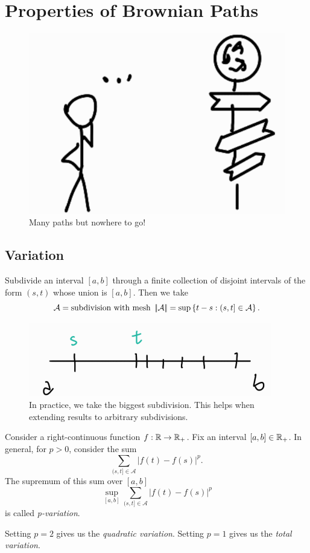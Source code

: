 \documentclass[12pt]{report}
\begin{document}
\section{Properties of Brownian Paths}
\begin{figure}[H]
	\centering
	\includegraphics[width=0.3\linewidth]{img/screenshot040}
	\caption{Many paths but nowhere to go!}
	\label{fig:screenshot040}
\end{figure}
\subsection{Variation}
Subdivide an interval $[a,b]$ through a finite collection of disjoint intervals of the form $(s,t)$ whose union is $[a,b]$. Then we take 
\begin{equation*}
	\mathcal{A}=\text{subdivision with mesh }\left|\negthinspace\left|\mathcal{A}\right|\negthinspace\right|=\sup\left\{t-s:(s,t]\in\mathcal{A}\right\}.
\end{equation*}
\begin{figure}[h]
	\centering
	\includegraphics[width=0.5\linewidth]{img/screenshot041}
	\caption{In practice, we take the biggest subdivision. This helps when extending results to arbitrary subdivisions.}
	\label{fig:screenshot041}
\end{figure}
\begin{definition}
	Consider a right-continuous function $f:\mathbb{R}\to\mathbb{R}_{+}$. Fix an interval $[a,b]\in\mathbb{R}_{+}$. In general, for $p>0$, consider the sum
	\begin{equation*}
		\sum_{(s,t]\in\mathcal{A}}|f(t)-f(s)|^{p}.
	\end{equation*}
	The supremum of this sum over $[a,b]$
	\begin{equation*}
		\sup_{[a,b]}\sum_{(s,t]\in\mathcal{A}}|f(t)-f(s)|^{p}
	\end{equation*}
	is called \emph{p-variation}.\par
	Setting $p=2$ gives us the \emph{quadratic variation}. Setting $p=1$ gives us the \emph{total variation}.
\end{definition}
\end{document}
